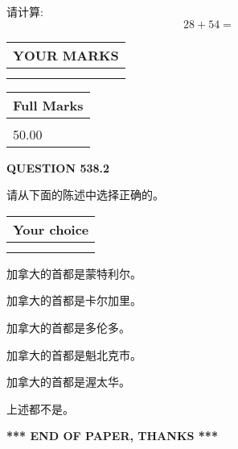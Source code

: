 \documentclass{ctexart}
\begin{document}
  
 
请计算:
\begin{equation}
28 +  %
54 = \nonumber
\end{equation}
 

 

 
  
\vspace{0.2in}
  
\noindent\begin{tabular}{|l|}
\hline
 YOUR MARKS  \\
\hline
 \\ 
 \\ 
\hline
\end{tabular}
\hspace{0.05in} \begin{tabular}{|l|}
\hline
 Full Marks  \\
\hline
 \\ 
50.00 \\
\hline
\end{tabular}
{\textbf{\Large{QUESTION
538.2 
}}}
  
  
请从下面的陈述中选择正确的。
  
  
\noindent\hspace{3.0in} \begin{tabular}{|l|}
\hline
Your choice \\
\hline
 \\ 
 \\ 
\hline
\end{tabular}
  
  
 
 
加拿大的首都是蒙特利尔。
 
 
加拿大的首都是卡尔加里。
 
 
加拿大的首都是多伦多。
 
 
加拿大的首都是魁北克市。
 
 
加拿大的首都是渥太华。
 
 
 上述都不是。
 
 
   
   
 \vspace{0.2in}
 
   
   
   
   
\vspace{1.0in} 
{\textbf{\large{ *** END OF PAPER, THANKS *** }}} 
   
\end{document}
